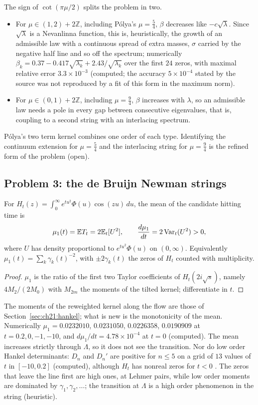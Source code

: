 The sign of $\cot(\pi\mu/2)$ splits the problem in two.
\begin{itemize}
\item For $\mu\in(1,2)+2\mathbb Z$, including P\'olya's $\mu=\tfrac54$, $\beta$ decreases like $-c\sqrt\lambda$. Since $\sqrt\lambda$ is a Nevanlinna function, this is, heuristically, the growth of an admissible law with a continuous spread of extra masses, $\sigma$ carried by the negative half line and so off the spectrum; numerically $\beta_k=0.37-0.417\sqrt{\lambda_k}+2.43/\sqrt{\lambda_k}$ over the first $24$ zeros, with maximal relative error $3.3\times10^{-3}$ (computed; the accuracy $5\times10^{-4}$ stated by the source was not reproduced by a fit of this form in the maximum norm).
\item For $\mu\in(0,1)+2\mathbb Z$, including $\mu=\tfrac94$, $\beta$ increases with $\lambda$, so an admissible law needs a pole in every gap between consecutive eigenvalues, that is, coupling to a second string with an interlacing spectrum.
\end{itemize}
P\'olya's two term kernel combines one order of each type. Identifying the continuum extension for $\mu=\tfrac54$ and the interlacing string for $\mu=\tfrac94$ is the refined form of the problem (open).

\subsection{Problem 3: the de Bruijn Newman strings}

\begin{proposition}\label{ev:prop:dbn}
For $H_t(z)=\int_0^\infty e^{tu^2}\Phi(u)\cos(zu)\,du$, the mean of the candidate hitting time is
\[
\mu_1(t)=\mathbb{E} T_t=2\mathbb{E}_t[U^2],\qquad\frac{d\mu_1}{dt}=2\operatorname{Var}_t(U^2)>0,
\]
where $U$ has density proportional to $e^{tu^2}\Phi(u)$ on $(0,\infty)$. Equivalently $\mu_1(t)=\sum_k\gamma_k(t)^{-2}$, with $\pm2\gamma_k(t)$ the zeros of $H_t$ counted with multiplicity.
\end{proposition}

\begin{proof}
$\mu_1$ is the ratio of the first two Taylor coefficients of $H_t(2i\sqrt s)$, namely $4M_2/(2M_0)$ with $M_{2m}$ the moments of the tilted kernel; differentiate in $t$.
\end{proof}

The moments of the reweighted kernel along the flow are those of Section~\ref{sec:ch21:hankel}; what is new is the monotonicity of the mean. Numerically $\mu_1=0.0232010$, $0.0231050$, $0.0226358$, $0.0190909$ at $t=0.2,0,-1,-10$, and $d\mu_1/dt=4.78\times10^{-4}$ at $t=0$ (computed). The mean increases strictly through $\Lambda$, so it does not see the transition. Nor do low order Hankel determinants: $D_n$ and $D_n'$ are positive for $n\le5$ on a grid of $13$ values of $t$ in $[-10,0.2]$ (computed), although $H_t$ has nonreal zeros for $t<0$ \cite{RodgersTao}. The zeros that leave the line first are high ones, at Lehmer pairs, while low order moments are dominated by $\gamma_1,\gamma_2,\ldots$; the transition at $\Lambda$ is a high order phenomenon in the string (heuristic).

